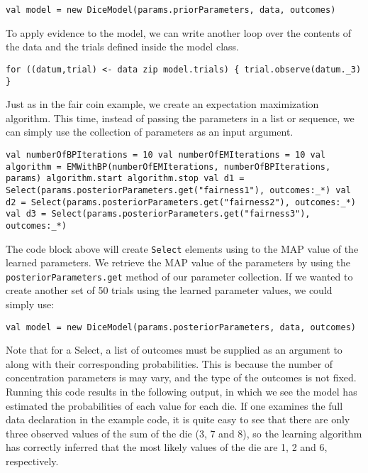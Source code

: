 \begin{flushleft}
 \texttt{val model = new DiceModel(params.priorParameters, data, outcomes)
}
\end{flushleft}

To apply evidence to the model, we can write another loop over the contents of the data and the trials defined inside the model class.

\begin{flushleft}
\texttt{for ((datum,trial) <- data zip model.trials) \{
    \newline \tab trial.observe(datum.\_3)
    \}
}
\end{flushleft}

Just as in the fair coin example, we create an expectation maximization algorithm. This time, instead of passing the parameters in a list or sequence, we can simply use the collection of parameters as an input argument.

\begin{flushleft}
\texttt{val numberOfBPIterations = 10
	\newline val numberOfEMIterations = 10
    \newline val algorithm = EMWithBP(numberOfEMIterations, numberOfBPIterations, params)
    \newline algorithm.start
    \newline algorithm.stop
    \newline val d1 = Select(params.posteriorParameters.get("fairness1"), outcomes:\_*)
    \newline val d2 = Select(params.posteriorParameters.get("fairness2"), outcomes:\_*)
    \newline val d3 = Select(params.posteriorParameters.get("fairness3"), outcomes:\_*)
}
\end{flushleft}

The code block above will create \texttt{Select} elements using to the MAP value of the learned parameters. We retrieve the MAP value of the parameters by using the \texttt{posteriorParameters.get} method of our parameter collection. If we wanted to create another set of 50 trials using the learned parameter values, we could simply use:

\begin{flushleft}
 \texttt{val model = new DiceModel(params.posteriorParameters, data, outcomes)
}
\end{flushleft}

Note that for a Select, a list of outcomes must be supplied as an argument to along with their corresponding probabilities. This is because the number of concentration parameters is may vary, and the type of the outcomes is not fixed. Running this code results in the following output, in which we see the model has estimated the probabilities of each value for each die. If one examines the full data declaration in the example code, it is quite easy to see that there are only three observed values of the sum of the die (3, 7 and 8), so the learning algorithm has correctly inferred that the most likely values of the die are 1, 2 and 6, respectively.

